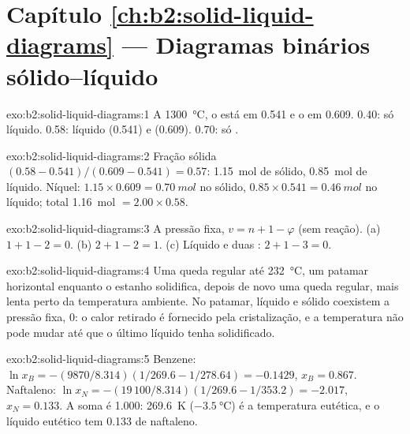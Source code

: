 \section*{Capítulo \ref{ch:b2:solid-liquid-diagrams} --- Diagramas binários sólido--líquido}

\begin{solution}{exo:b2:solid-liquid-diagrams:1}
A \qty{1300}{\degreeCelsius}, o  está em 0.541 e o  em 0.609.
0.40: só líquido. 0.58: líquido (0.541) e  (0.609). 0.70:
só .
\end{solution}

\begin{solution}{exo:b2:solid-liquid-diagrams:2}
Fração sólida $(0.58 - 0.541)/(0.609 - 0.541) = 0.57$: \qty{1.15}{mol} de sólido,
\qty{0.85}{mol} de líquido. Níquel: $1.15 \times 0.609 = \qty{0.70}{mol}$ no
sólido, $0.85 \times 0.541 = \qty{0.46}{mol}$ no líquido; total \qty{1.16}{mol}
$= 2.00 \times 0.58$.
\end{solution}

\begin{solution}{exo:b2:solid-liquid-diagrams:3}
A pressão fixa, $v = n + 1 - \varphi$ (sem reação). (a) $1 + 1 - 2 = 0$.
(b) $2 + 1 - 2 = 1$. (c) Líquido e duas : $2 + 1 - 3 = 0$.
\end{solution}

\begin{solution}{exo:b2:solid-liquid-diagrams:4}
Uma queda regular até \qty{232}{\degreeCelsius}, um patamar horizontal enquanto
o estanho solidifica, depois de novo uma queda regular, mais lenta perto da
temperatura ambiente. No patamar, líquido e sólido coexistem a pressão fixa,
 0: o calor retirado é fornecido pela cristalização, e a temperatura
não pode mudar até que o último líquido tenha solidificado.
\end{solution}

\begin{solution}{exo:b2:solid-liquid-diagrams:5}
Benzene: $\ln x_B = -(9870/8.314)(1/269.6 - 1/278.64) = -0.1429$, $x_B =
0.867$. Naftaleno: $\ln x_N = -(19\,100/8.314)(1/269.6 - 1/353.2) = -2.017$,
$x_N = 0.133$. A soma é 1.000: \qty{269.6}{K} ($\qty{-3.5}{\degreeCelsius}$) é
a temperatura eutética, e o líquido eutético tem 0.133 de naftaleno.
\end{solution}

